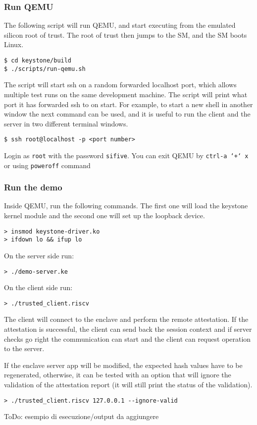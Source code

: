 \subsubsection{Run QEMU}
The following script will run QEMU, and start executing from the emulated silicon root of trust. The root of trust then jumps to the SM, and the SM boots Linux. 
\begin{lstlisting}[frame=single]
$ cd keystone/build
$ ./scripts/run-qemu.sh
\end{lstlisting}
The script will start ssh on a random forwarded localhost port, which allows multiple test runs on the same development machine. The script will print what port it has forwarded ssh to on start. For example, to start a new shell in another window the next command can be used, and it is useful to run the client and the server in two different terminal windows. 
\begin{lstlisting}[frame=single]
$ ssh root@localhost -p <port number>
\end{lstlisting}
Login as \texttt{\color{RedOrange}root} with the password \texttt{\color{RedOrange}sifive}. You can exit QEMU by \texttt{\color{RedOrange}ctrl-a\ `+`\ x} or using  \texttt{\color{RedOrange}poweroff}  command

\subsubsection{Run the demo}
Inside QEMU, run the following commands. The first one will load the keystone kernel module and the second one will set up the loopback device. 
\begin{lstlisting}[frame=single]
> insmod keystone-driver.ko 
> ifdown lo && ifup lo           
\end{lstlisting}
On the server side run: 
\begin{lstlisting}[frame=single]
> ./demo-server.ke         
\end{lstlisting}
On the client side run:
\begin{lstlisting}[frame=single]
> ./trusted_client.riscv         
\end{lstlisting}
The client will connect to the enclave and perform the remote attestation. If the attestation is successful, the client can send back the session context and if server checks go right the communication can start and the client can request operation to the server. 

If the enclave server app will be modified, the expected hash values have to be regenerated, otherwise, it can be tested with an option that will ignore the validation of the attestation report (it will still print the status of the validation). 

\begin{lstlisting}[frame=single]
  > ./trusted_client.riscv 127.0.0.1 --ignore-valid        
\end{lstlisting}
{\color{red} ToDo: esempio di esecuzione/output da aggiungere}
